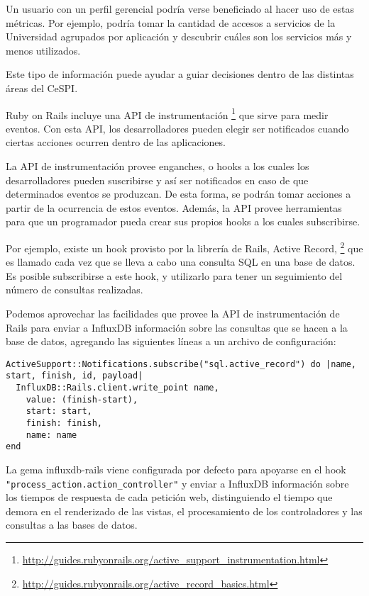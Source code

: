 Un usuario con un perfil gerencial podría verse beneficiado al hacer uso de estas métricas. Por ejemplo, podría tomar la cantidad de accesos a servicios de la Universidad agrupados por aplicación y descubrir cuáles son los servicios más y menos utilizados.

Este tipo de información puede ayudar a guiar decisiones dentro de las distintas áreas del CeSPI.

Ruby on Rails incluye una API de instrumentación \footnote{\url{http://guides.rubyonrails.org/active_support_instrumentation.html}} que sirve para medir eventos. Con esta API, los desarrolladores pueden elegir ser notificados cuando ciertas acciones ocurren dentro de las aplicaciones.

La API de instrumentación provee enganches, o hooks a los cuales los desarrolladores pueden suscribirse y así ser notificados en caso de que determinados eventos se produzcan. De esta forma, se podrán tomar acciones a partir de la ocurrencia de estos eventos. Además, la API provee herramientas para que un programador pueda crear sus propios hooks a los cuales subscribirse.

Por ejemplo, existe un hook provisto por la librería de Rails, Active Record, \footnote{\url{http://guides.rubyonrails.org/active_record_basics.html}} que es llamado cada vez que se lleva a cabo una consulta SQL en una base de datos. Es posible subscribirse a este hook, y utilizarlo para tener un seguimiento del número de consultas realizadas.

Podemos aprovechar las facilidades que provee la API de instrumentación de Rails para enviar a InfluxDB información sobre las consultas que se hacen a la base de datos, agregando las siguientes líneas a un archivo de configuración:

\begin{lstlisting}
ActiveSupport::Notifications.subscribe("sql.active_record") do |name, start, finish, id, payload|
  InfluxDB::Rails.client.write_point name,
    value: (finish-start),
    start: start,
    finish: finish,
    name: name
end
\end{lstlisting}

La gema influxdb-rails viene configurada por defecto para apoyarse en el hook \lstinline{"process_action.action_controller"} y enviar a InfluxDB información sobre los tiempos de respuesta de cada petición web, distinguiendo el tiempo que demora en el renderizado de las vistas, el procesamiento de los controladores y las consultas a las bases de datos.

